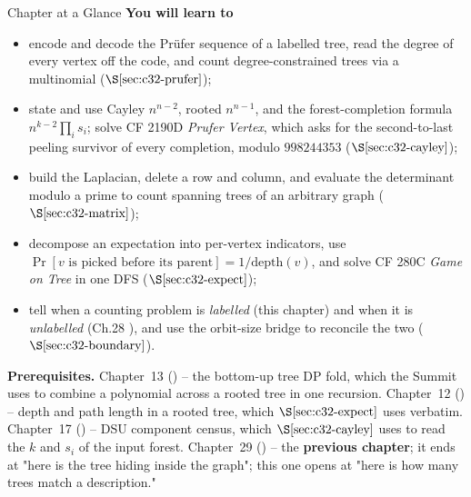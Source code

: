 \begin{chaptertheorybox}{Chapter at a Glance}
\textbf{You will learn to}
\begin{itemize}[nosep]
  \item encode and decode the Pr\"ufer sequence of a labelled tree, read the
        degree of every vertex off the code, and count degree-constrained
        trees via a multinomial (\(\secref{c32-prufer}\)); \hfill{}
  \item state and use Cayley \(n^{n-2}\), rooted \(n^{n-1}\), and the
        forest-completion formula \(n^{k-2}\prod_i s_i\); solve CF 2190D
        \emph{Prufer Vertex}, which asks for the second-to-last peeling
        survivor of every completion, modulo \(998244353\)
        (\(\secref{c32-cayley}\)); \hfill{}
  \item build the Laplacian, delete a row and column, and evaluate the
        determinant modulo a prime to count spanning trees of an arbitrary
        graph (\(\secref{c32-matrix}\)); \hfill{}
  \item decompose an expectation into per-vertex indicators, use
        \(\Pr[v\text{ is picked before its parent}]=1/\mathrm{depth}(v)\),
        and solve CF 280C \emph{Game on Tree} in one DFS
        (\(\secref{c32-expect}\)); \hfill{}
  \item tell when a counting problem is \emph{labelled} (this chapter) and
        when it is \emph{unlabelled} (Ch.28 ), and use the
        orbit-size bridge to reconcile the two (\(\secref{c32-boundary}\)).
        \hfill{}
\end{itemize}

\textbf{Prerequisites.} Chapter~13 () -- the bottom-up tree DP fold,
which the Summit uses to combine a polynomial across a rooted tree in one
recursion.  Chapter~12 () -- depth and path length in a rooted tree,
which \(\secref{c32-expect}\) uses verbatim.  Chapter~17 () -- DSU
component census, which \(\secref{c32-cayley}\) uses to read the \(k\) and
\(s_i\) of the input forest.  Chapter~29 () -- the \textbf{previous
chapter}; it ends at "here is the tree hiding inside the graph"; this one opens
at "here is how many trees match a description."
\end{chaptertheorybox}

